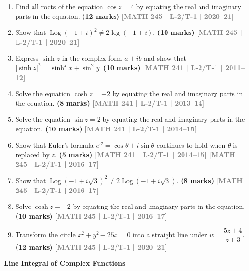 \documentclass[12pt,a4paper]{article}
\newcommand{\yr}[1]{\hfill\textcolor{gray}{\small\textbf{[#1]}}}
\newcommand{\mk}[1]{\textcolor{orange!70!black}{\small\textbf{(#1 marks)}}}
\newcommand{\subtopic}[2]{%
  \vspace{10pt}
  \noindent\begin{tcolorbox}[colback=#1!8,colframe=#1,boxrule=0.6pt,arc=4pt,
    left=6pt,right=6pt,top=4pt,bottom=4pt]
    \small\bfseries\textcolor{#1}{#2}
  \end{tcolorbox}
  \vspace{2pt}
}
\begin{document}
\begin{enumerate}

\item Find all roots of the equation $\cos z = 4$ by equating the real and imaginary parts in the equation.
\mk{12} \yr{MATH 245 | L-2/T-1 | 2020--21}

\item Show that $\operatorname{Log}(-1+i)^{2} \neq 2\log(-1+i)$.
\mk{10} \yr{MATH 245 | L-2/T-1 | 2020--21}

\item Express $\sinh z$ in the complex form $a+ib$ and show that $|\sinh z|^{2}=\sinh^{2}x+\sin^{2}y$.
\mk{10} \yr{MATH 241 | L-2/T-1 | 2011--12}

\item Solve the equation $\cosh z = -2$ by equating the real and imaginary parts in the equation.
\mk{8} \yr{MATH 241 | L-2/T-1 | 2013--14}

\item Solve the equation $\sin z = 2$ by equating the real and imaginary parts in the equation.
\mk{10} \yr{MATH 241 | L-2/T-1 | 2014--15}

\item Show that Euler's formula $e^{i\theta}=\cos \theta+i\sin \theta$ continues to hold when $\theta$ is replaced by $z$.
\mk{5} \yr{MATH 241 | L-2/T-1 | 2014--15} \yr{MATH 245 | L-2/T-1 | 2016--17}

\item Show that $\operatorname{Log}(-1+i\sqrt{3})^{2}\neq 2\operatorname{Log}(-1+i\sqrt{3})$.
\mk{8} \yr{MATH 245 | L-2/T-1 | 2016--17}

\item Solve $\cosh z=-2$ by equating the real and imaginary parts in the equation.
\mk{10} \yr{MATH 245 | L-2/T-1 | 2016--17}

\item Transform the circle $x^{2}+y^{2}-25x=0$ into a straight line under $w=\dfrac{5z+4}{z+3}$.
\mk{12} \yr{MATH 245 | L-2/T-1 | 2020--21}

\end{enumerate}

\subtopic{cE}{Line Integral of Complex Functions}
\label{sub:s5-lineint}
\end{document}

